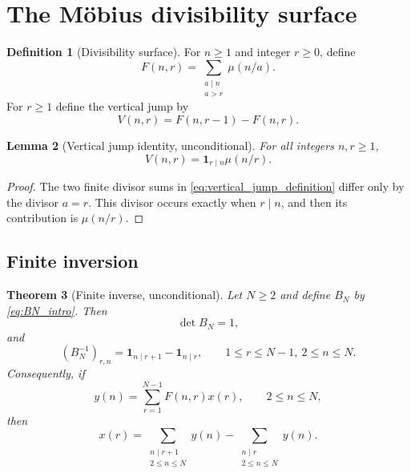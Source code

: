 \documentclass[11pt]{amsart}
\numberwithin{equation}{section}
\theoremstyle{plain}
\newtheorem{theorem}{Theorem}[section]
\newtheorem{lemma}[theorem]{Lemma}
\theoremstyle{definition}
\newtheorem{definition}[theorem]{Definition}
\theoremstyle{remark}
\newcommand{\one}{\mathbf 1}
\newcommand{\mob}{\mu}
\newcommand{\Fsurf}{F}
\newcommand{\Vjump}{V}
\begin{document}
\section{The Möbius divisibility surface}
\label{sec:surface}

\begin{definition}[Divisibility surface]
\label{def:surface}
For $n\ge1$ and integer $r\ge0$, define
\begin{equation}
\Fsurf(n,r)=\sum_{\substack{a\mid n\\a>r}}\mob(n/a).
\label{eq:surface_definition}
\end{equation}
For $r\ge1$ define the vertical jump by
\begin{equation}
\Vjump(n,r)=\Fsurf(n,r-1)-\Fsurf(n,r).
\label{eq:vertical_jump_definition}
\end{equation}
\end{definition}

\begin{lemma}[Vertical jump identity, unconditional]
\label{lem:vertical_jump}
For all integers $n,r\ge1$,
\begin{equation}
\Vjump(n,r)=\one_{r\mid n}\mob(n/r).
\label{eq:vertical_jump_identity}
\end{equation}
\end{lemma}

\begin{proof}
The two finite divisor sums in \eqref{eq:vertical_jump_definition} differ only by the divisor $a=r$.  This divisor occurs exactly when $r\mid n$, and then its contribution is $\mob(n/r)$.
\end{proof}

\subsection{Finite inversion}
\label{subsec:finite_inversion}

\begin{theorem}[Finite inverse, unconditional]
\label{thm:finite_inverse}
Let $N\ge2$ and define $B_N$ by \eqref{eq:BN_intro}.  Then
\begin{equation}
\det B_N=1,
\label{eq:BN_determinant}
\end{equation}
and
\begin{equation}
(B_N^{-1})_{r,n}=\one_{n\mid r+1}-\one_{n\mid r},
\qquad
1\le r\le N-1,\ 2\le n\le N.
\label{eq:BN_inverse}
\end{equation}
Consequently, if
\begin{equation}
y(n)=\sum_{r=1}^{N-1}\Fsurf(n,r)x(r),
\qquad 2\le n\le N,
\label{eq:finite_system}
\end{equation}
then
\begin{equation}
x(r)=
\sum_{\substack{n\mid r+1\\2\le n\le N}}y(n)
-
\sum_{\substack{n\mid r\\2\le n\le N}}y(n).
\label{eq:finite_reconstruction}
\end{equation}
\end{theorem}
\end{document}
